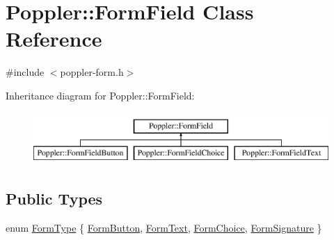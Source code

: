 \hypertarget{class_poppler_1_1_form_field}{}\section{Poppler\+:\+:Form\+Field Class Reference}
\label{class_poppler_1_1_form_field}


{\ttfamily \#include $<$poppler-\/form.\+h$>$}

Inheritance diagram for Poppler\+:\+:Form\+Field\+:\begin{figure}[H]
\begin{center}
\leavevmode
\includegraphics[height=2.000000cm]{class_poppler_1_1_form_field}
\end{center}
\end{figure}
\subsection*{Public Types}
\begin{DoxyCompactItemize}
\item 
enum \hyperlink{class_poppler_1_1_form_field_af9b28bf05b29780f81445b21a0ed7423}{Form\+Type} \{ \hyperlink{class_poppler_1_1_form_field_af9b28bf05b29780f81445b21a0ed7423ab70f74b515b58ab4695caefc1874343a}{Form\+Button}, 
\hyperlink{class_poppler_1_1_form_field_af9b28bf05b29780f81445b21a0ed7423ae2d26d988857743ad6349e857c6261ed}{Form\+Text}, 
\hyperlink{class_poppler_1_1_form_field_af9b28bf05b29780f81445b21a0ed7423af60364139d8f1dda0b234f2b058a6926}{Form\+Choice}, 
\hyperlink{class_poppler_1_1_form_field_af9b28bf05b29780f81445b21a0ed7423ab7892fe0ff46fb78dc70a8b2f6b49c21}{Form\+Signature}
 \}
\end{DoxyCompactItemize}
